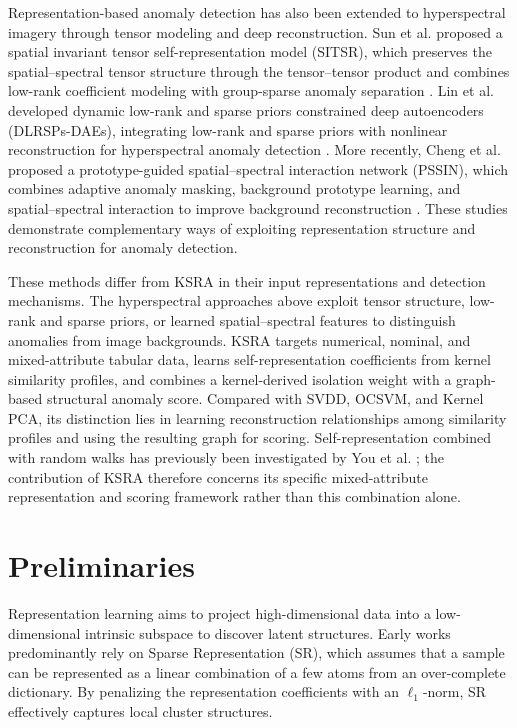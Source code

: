 \documentclass[ASNA,twocolumn]{USG} %
\begin{document}
Representation-based anomaly detection has also been extended to hyperspectral imagery through tensor modeling and deep reconstruction. Sun et al. proposed a spatial invariant tensor self-representation model (SITSR), which preserves the spatial–spectral tensor structure through the tensor–tensor product and combines low-rank coefficient modeling with group-sparse anomaly separation \cite{10019572}. Lin et al. developed dynamic low-rank and sparse priors constrained deep autoencoders (DLRSPs-DAEs), integrating low-rank and sparse priors with nonlinear reconstruction for hyperspectral anomaly detection \cite{lin2023dynamic}. More recently, Cheng et al. proposed a prototype-guided spatial–spectral interaction network (PSSIN), which combines adaptive anomaly masking, background prototype learning, and spatial–spectral interaction to improve background reconstruction \cite{cheng2025prototype}. These studies demonstrate complementary ways of exploiting representation structure and reconstruction for anomaly detection.

These methods differ from KSRA in their input representations and detection mechanisms. The hyperspectral approaches above exploit tensor structure, low-rank and sparse priors, or learned spatial–spectral features to distinguish anomalies from image backgrounds. KSRA targets numerical, nominal, and mixed-attribute tabular data, learns self-representation coefficients from kernel similarity profiles, and combines a kernel-derived isolation weight with a graph-based structural anomaly score. Compared with SVDD, OCSVM, and Kernel PCA, its distinction lies in learning reconstruction relationships among similarity profiles and using the resulting graph for scoring. Self-representation combined with random walks has previously been investigated by You et al. \cite{you2017provable}; the contribution of KSRA therefore concerns its specific mixed-attribute representation and scoring framework rather than this combination alone.



\section{Preliminaries}\label{Preliminaries}

Representation learning aims to project high-dimensional data into a low-dimensional intrinsic subspace to discover latent structures. Early works predominantly rely on Sparse Representation (SR), which assumes that a sample can be represented as a linear combination of a few atoms from an over-complete dictionary. By penalizing the representation coefficients with an $\ell_1$-norm, SR effectively captures local cluster structures. 
\end{document}
